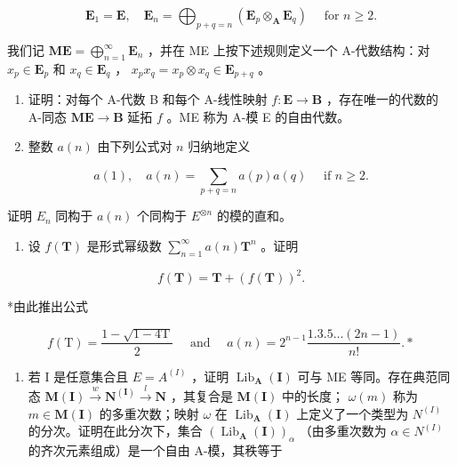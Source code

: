 \[
\mathbf {E} _ {1} = \mathbf {E}, \quad \mathbf {E} _ {n} = \bigoplus_ {p + q = n} \left(\mathbf {E} _ {p} \otimes_ {\mathbf {A}} \mathbf {E} _ {q}\right) \quad \text { for } n \geqslant 2.
\]

我们记 \(\mathbf{ME} = \bigoplus_{n=1}^{\infty} \mathbf{E}_n\) ，并在 ME 上按下述规则定义一个 A-代数结构：对 \(x_p \in \mathbf{E}_p\) 和 \(x_q \in \mathbf{E}_q\) ， \(x_p x_q = x_p \otimes x_q \in \mathbf{E}_{p+q}\) 。

\begin{enumerate}
\def\labelenumi{(\alph{enumi})}
\item
  证明：对每个 A-代数 B 和每个 A-线性映射 \(f: \mathbf{E} \to \mathbf{B}\) ，存在唯一的代数的 A-同态 \(\mathbf{ME} \to \mathbf{B}\) 延拓 \(f\) 。ME 称为 A-模 E 的自由代数。
\item
  整数 \(a(n)\) 由下列公式对 \(n\) 归纳地定义
\end{enumerate}

\[
a (1), \quad a (n) = \sum_ {p + q = n} a (p) a (q) \quad \text { if } n \geqslant 2.
\]

证明 \(E_{n}\) 同构于 \(a(n)\) 个同构于 \(E^{\otimes n}\) 的模的直和。

\begin{enumerate}
\def\labelenumi{(\alph{enumi})}
\setcounter{enumi}{2}
\tightlist
\item
  设 \(f(\mathbf{T})\) 是形式幂级数 \(\sum_{n=1}^{\infty} a(n)\mathbf{T}^n\) 。证明
\end{enumerate}

\[
f (\mathbf {T}) = \mathbf {T} + (f (\mathbf {T})) ^ {2}.
\]

*由此推出公式

\[
f (\mathrm{T}) = \frac {1 - \sqrt {1 - 4 \mathrm{T}}}{2} \quad \text { and } \quad a (n) = 2 ^ {n - 1} \frac {1 . 3 . 5 \dots (2 n - 1)}{n !}. *
\]

\begin{enumerate}
\def\labelenumi{(\alph{enumi})}
\setcounter{enumi}{3}
\tightlist
\item
  若 I 是任意集合且 \(E = A^{(I)}\) ，证明 \(\operatorname{Lib}_{\mathbf{A}}(\mathbf{I})\) 可与 ME 等同。存在典范同态 \(\mathbf{M}(\mathbf{I}) \xrightarrow{w} \mathbf{N}^{(\mathbf{I})} \xrightarrow{l} \mathbf{N}\) ，其复合是 \(\mathbf{M}(\mathbf{I})\) 中的长度； \(\omega(m)\) 称为 \(m \in \mathbf{M}(\mathbf{I})\) 的多重次数；映射 \(\omega\) 在 \(\operatorname{Lib}_{\mathbf{A}}(\mathbf{I})\) 上定义了一个类型为 \(N^{(I)}\) 的分次。证明在此分次下，集合 \((\operatorname{Lib}_{\mathbf{A}}(\mathbf{I}))_{\alpha}\) （由多重次数为 \(\alpha \in N^{(I)}\) 的齐次元素组成）是一个自由 A-模，其秩等于
\end{enumerate}

